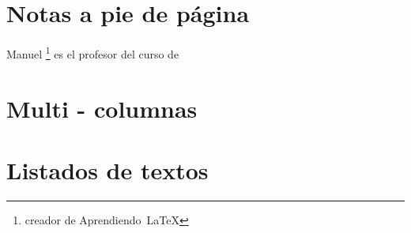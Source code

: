 \documentclass[a4paper, 11pt]{article}
\begin{document}
    \section{Notas a pie de página}
      Manuel \textcolor{blue}{\footnote{creador de Aprendiendo\, \LaTeX}} es el profesor del curso de
      
    \section{Multi - columnas}
       \begin{multicols}{2}
         \lipsum[2] \lipsum[1]    
       \end{multicols}
    
    \section{Listados de textos}
\end{document}
